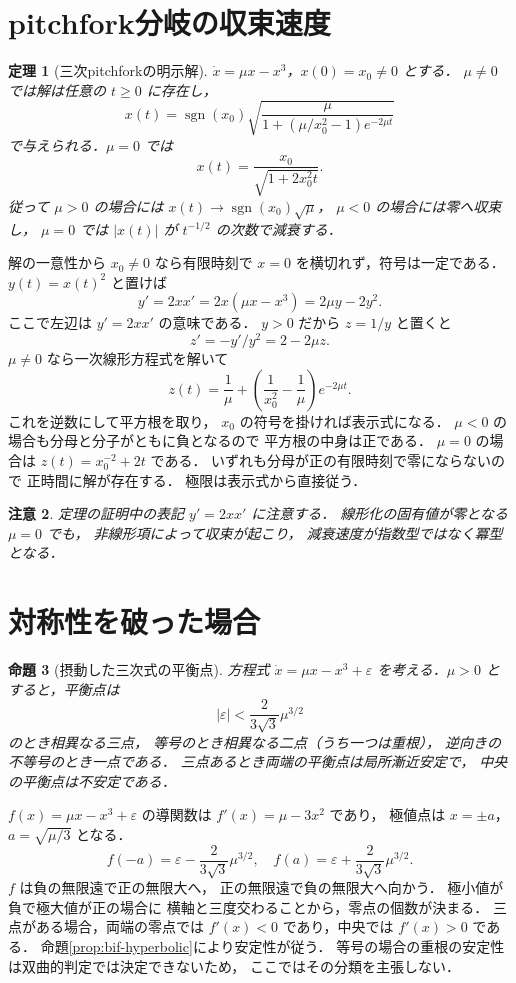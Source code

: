 \documentclass[a5paper,10pt,onecolumn]{jsarticle}
\makeatletter
\theoremstyle{mathnotetheorem}
\newtheorem{theorem}{定理}[section]
\newtheorem{proposition}[theorem]{命題}
\newtheorem{remark}[theorem]{注意}
\renewcommand{\proofname}{証明}
\renewenvironment{proof}[1][\proofname]{%
  \par\pushQED{\qed}\normalfont\topsep4\p@\@plus2\p@\relax
  \trivlist\item[\hskip\labelsep\bfseries #1]\ignorespaces
}{\popQED\endtrivlist\@endpefalse}
\makeatother
\begin{document}
\section{pitchfork分岐の収束速度}
\begin{theorem}[三次pitchforkの明示解]\label{thm:pitchfork-explicit}
$\dot x=\mu x-x^3$，$x(0)=x_0\ne0$ とする．
$\mu\ne0$ では解は任意の $t\ge0$ に存在し，
\[
 x(t)=\operatorname{sgn}(x_0)
 \sqrt{\frac{\mu}
 {1+(\mu/x_0^2-1)e^{-2\mu t}}}
\]
で与えられる．$\mu=0$ では
\[
 x(t)=\frac{x_0}{\sqrt{1+2x_0^2t}}.
\]
従って $\mu>0$ の場合には
$x(t)\to\operatorname{sgn}(x_0)\sqrt\mu$，
$\mu<0$ の場合には零へ収束し，
$\mu=0$ では $|x(t)|$ が $t^{-1/2}$ の次数で減衰する．
\end{theorem}
\begin{proof}
解の一意性から $x_0\ne0$ なら有限時刻で
$x=0$ を横切れず，符号は一定である．
$y(t)=x(t)^2$ と置けば
\[
 y'=2xx'=2x(\mu x-x^3)
    =2\mu y-2y^2.
\]
ここで左辺は $y'=2xx'$ の意味である．
$y>0$ だから $z=1/y$ と置くと
\[
 z'=-y'/y^2=2-2\mu z.
\]
$\mu\ne0$ なら一次線形方程式を解いて
\[
 z(t)=\frac1\mu+
       \left(\frac1{x_0^2}-\frac1\mu\right)e^{-2\mu t}.
\]
これを逆数にして平方根を取り，
$x_0$ の符号を掛ければ表示式になる．
$\mu<0$ の場合も分母と分子がともに負となるので
平方根の中身は正である．
$\mu=0$ の場合は $z(t)=x_0^{-2}+2t$ である．
いずれも分母が正の有限時刻で零にならないので
正時間に解が存在する．
極限は表示式から直接従う．
\end{proof}
\begin{remark}
定理の証明中の表記 $y'=2xx'$ に注意する．
線形化の固有値が零となる $\mu=0$ でも，
非線形項によって収束が起こり，
減衰速度が指数型ではなく冪型となる．
\end{remark}

\section{対称性を破った場合}
\begin{proposition}[摂動した三次式の平衡点]\label{prop:imperfect-pitchfork}
方程式
$\dot x=\mu x-x^3+\varepsilon$
を考える．$\mu>0$ とすると，平衡点は
\[
 |\varepsilon|<
 \frac{2}{3\sqrt3}\mu^{3/2}
\]
のとき相異なる三点，
等号のとき相異なる二点（うち一つは重根），
逆向きの不等号のとき一点である．
三点あるとき両端の平衡点は局所漸近安定で，
中央の平衡点は不安定である．
\end{proposition}
\begin{proof}
$f(x)=\mu x-x^3+\varepsilon$ の導関数は
$f'(x)=\mu-3x^2$ であり，
極値点は $x=\pm a$，$a=\sqrt{\mu/3}$ となる．
\[
 f(-a)=\varepsilon-\frac{2}{3\sqrt3}\mu^{3/2},
 \quad f(a)=\varepsilon+\frac{2}{3\sqrt3}\mu^{3/2}.
\]
$f$ は負の無限遠で正の無限大へ，
正の無限遠で負の無限大へ向かう．
極小値が負で極大値が正の場合に
横軸と三度交わることから，零点の個数が決まる．
三点がある場合，両端の零点では
$f'(x)<0$ であり，中央では $f'(x)>0$ である．
命題\ref{prop:bif-hyperbolic}により安定性が従う．
等号の場合の重根の安定性は双曲的判定では決定できないため，
ここではその分類を主張しない．
\end{proof}
\end{document}
